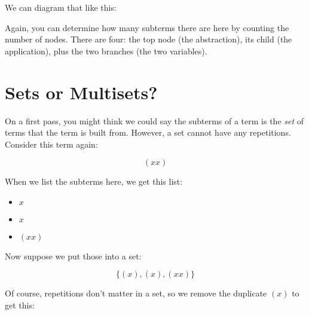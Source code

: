 \documentclass{book}
\numberwithin{equation}{chapter}
\begin{document}
\noindent
We can diagram that like this:

\begin{center}
\end{center}

\noindent
Again, you can determine how many subterms there are here by counting the number of nodes. There are four: the top node (the abstraction), its child (the application), plus the two branches (the two variables).


\section{Sets or Multisets?}

On a first pass, you might think we could say the subterms of a term is the \textit{set} of terms that the term is built from. However, a set cannot have any repetitions. Consider this term again:

\begin{equation}
(xx)
\end{equation}

\noindent
When we list the subterms here, we get this list:

\begin{itemize}
\item{$x$}
\item{$x$}
\item{$(x x)$}
\end{itemize}

\noindent
Now suppose we put those into a set:

\begin{equation}
\{ (x), (x), (x x) \}
\end{equation}

\noindent
Of course, repetitions don't matter in a set, so we remove the duplicate $(x)$ to get this:
\end{document}

